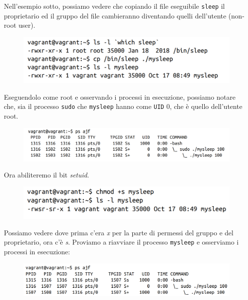 Nell'esempio sotto, possiamo vedere che copiando il file eseguibile \verb|sleep|
il proprietario ed il gruppo del file cambieranno diventando quelli dell'utente
(non-root user).


\begin{figure}[H]
    \centering
    \includegraphics[width=\textwidth, keepaspectratio]{capitoli/os_security/imgs/setuid1.png}
\end{figure}

Eseguendolo come root e osservando i processi in esecuzione, possiamo notare che,
sia il processo \verb|sudo| che \verb|mysleep| hanno come \verb|UID| 0, che è quello
dell'utente root.

\begin{figure}[H]
    \centering
    \includegraphics[width=\textwidth, keepaspectratio]{capitoli/os_security/imgs/setuid2.png}
\end{figure}


Ora abiliteremo il bit \textit{setuid}.

\begin{figure}[H]
    \centering
    \includegraphics[width=\textwidth, keepaspectratio]{capitoli/os_security/imgs/setuid3.png}
\end{figure}

Possiamo vedere dove prima c'era \textit{x} per la parte di permessi del gruppo e
del proprietario, ora c'è \textit{s}. Proviamo a riavviare il processo \verb|mysleep|
e osserviamo i processi in esecuzione:

\begin{figure}[H]
    \centering
    \includegraphics[width=\textwidth, keepaspectratio]{capitoli/os_security/imgs/setuid4.png}
\end{figure}

